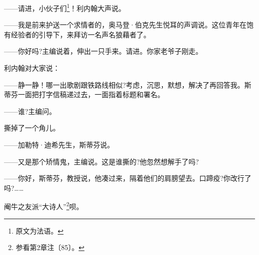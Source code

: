 \par ——请进，小伙子们\footnote{原文为法语。}！利内翰大声说。
\par ——我是前来护送一个求情者的，奥马登·伯克先生悦耳的声调说。这位青年在饱有经验者的引导下，来拜访一名声名狼藉者了。
\par ——你好吗?主编说着，伸出一只手来。请进。你家老爷子刚走。
\par 利内翰对大家说：
\par ——静一静！哪一出歌剧跟铁路线相似?考虑，沉思，默想，解决了再回答我。斯蒂芬一面把打字信稿递过去，一面指着标题和署名。
\par ——谁?主编问。
\par 撕掉了一个角儿。
\par ——加勒特·迪希先生，斯蒂芬说。
\par ——又是那个矫情鬼，主编说。这是谁撕的?他忽然想解手了吗?
\par ——你好，斯蒂芬，教授说，他凑过来，隔着他们的肩膀望去。口蹄疫?你改行了吗?……
\par 阉牛之友派“大诗人”\footnote{参看第2章注〔85〕。}呗。
